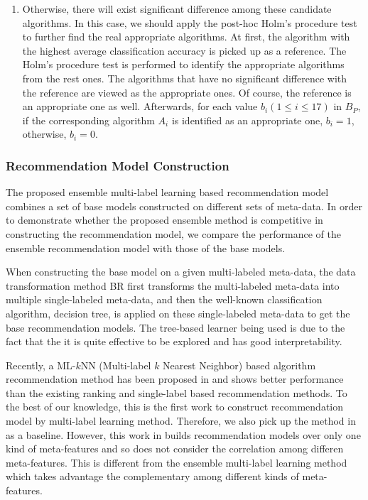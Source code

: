 \documentclass[acmsmall]{acmart}
\begin{document}
\begin{enumerate}
\begin{enumerate}
\begin{enumerate}
			\item Otherwise, there will exist significant
			difference among these candidate algorithms. In this case, we should apply
			the post-hoc Holm's procedure test to further find the real
			appropriate algorithms. At first, the algorithm with the
			highest average classification accuracy is picked up as a reference.
			The Holm's procedure test is performed to identify the appropriate
			algorithms from the rest ones. The algorithms that have no significant
			difference with the reference are viewed as the appropriate
			ones. Of course, the reference is an appropriate one as
			well. Afterwards, for each value $b_i (1\leq i\leq 17)$ in $B_{P}$, if the corresponding
			algorithm $A_i$ is identified as an appropriate one, $b_i = 1$,
			otherwise, $b_i = 0$.
		\end{enumerate}
	\end{enumerate}
\end{enumerate}

\subsubsection{Recommendation Model Construction}

The proposed ensemble multi-label learning based recommendation
model combines a set of base models constructed on different sets of
meta-data. In order to demonstrate whether the proposed ensemble
method is competitive in constructing the recommendation model, we
compare the performance of the ensemble recommendation model with
those of the base models.

When constructing the base model on a given multi-labeled meta-data,
the data transformation method BR first transforms the multi-labeled
meta-data into multiple single-labeled meta-data, and then the
well-known classification algorithm, decision tree, is applied on
these single-labeled meta-data to get the base recommendation
models. The tree-based learner being used is due to the fact that
the it is quite effective to be explored and has good
interpretability.

Recently, a ML-$k$NN (Multi-label $k$ Nearest Neighbor) based algorithm recommendation
method has been proposed in \cite{wang2014generic} and shows better
performance than the existing ranking and single-label based
recommendation methods. To the best of our knowledge, this is the first work to construct
recommendation model by multi-label learning method. Therefore, we also pick up the method in \cite{wang2014generic} as a baseline. However, this work in \cite{wang2014generic} builds recommendation models over only one kind of meta-features and so does not consider the correlation among differen meta-features. This is different from the ensemble multi-label learning method which takes advantage the complementary among different kinds of meta-features.
\end{document}
